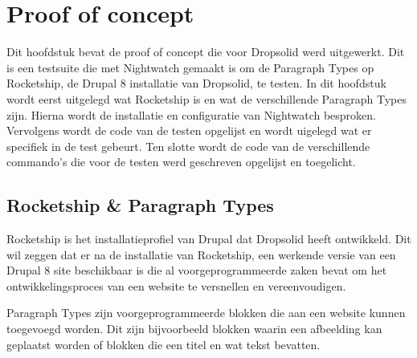 \chapter{Proof of concept}
\label{ch:proofofconcept}
Dit hoofdstuk bevat de proof of concept die voor Dropsolid werd uitgewerkt. Dit is een \gls{testsuite} die met Nightwatch gemaakt is om de \gls{Paragraph Types} op Rocketship, de Drupal 8 installatie van Dropsolid, te testen. In dit hoofdstuk wordt eerst uitgelegd wat Rocketship is en wat de verschillende \gls{Paragraph Types} zijn. Hierna wordt de installatie en configuratie van Nightwatch besproken. Vervolgens wordt de code van de testen opgelijst en wordt uigelegd wat er specifiek in de test gebeurt. Ten slotte wordt de code van de verschillende commando's die voor de testen werd geschreven opgelijst en toegelicht.

\clearpage
\section{Rocketship \& Paragraph Types}
Rocketship is het installatieprofiel van Drupal dat Dropsolid heeft ontwikkeld. Dit wil zeggen dat er na de installatie van Rocketship, een werkende versie van een Drupal 8 site beschikbaar is die al voorgeprogrammeerde zaken bevat om het ontwikkelingsproces van een website te versnellen en vereenvoudigen.

\gls{Paragraph Types} zijn voorgeprogrammeerde blokken die aan een website kunnen toegevoegd worden. Dit zijn bijvoorbeeld blokken waarin een afbeelding kan geplaatst worden of blokken die een titel en wat tekst bevatten.

\clearpage
